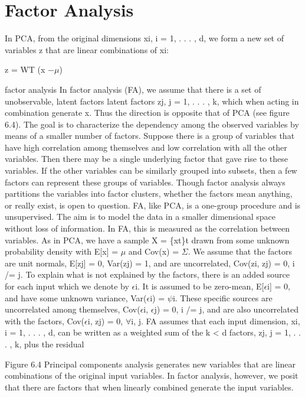 \section{Factor Analysis}

In PCA, from the original dimensions xi, i = 1, . . . , d, we form a new set of variables z that are linear combinations of xi:

z = WT (x $-$$\mu$)

factor analysis In factor analysis (FA), we assume that there is a set of unobservable, latent factors latent factors zj, j = 1, . . . , k, which when acting in combination generate x. Thus the direction is opposite that of PCA (see figure 6.4). The goal is to characterize the dependency among the observed variables by means of a smaller number of factors. Suppose there is a group of variables that have high correlation among themselves and low correlation with all the other variables. Then there may be a single underlying factor that gave rise to these variables. If the other variables can be similarly grouped into subsets, then a few factors can represent these groups of variables. Though factor analysis always partitions the variables into factor clusters, whether the factors mean anything, or really exist, is open to question. FA, like PCA, is a one-group procedure and is unsupervised. The aim is to model the data in a smaller dimensional space without loss of information. In FA, this is measured as the correlation between variables. As in PCA, we have a sample X = \{xt\}t drawn from some unknown probability density with E[x] = $\mu$ and Cov(x) = $\Sigma$. We assume that the factors are unit normals, E[zj] = 0, Var(zj) = 1, and are uncorrelated, Cov(zi, zj) = 0, i /= j. To explain what is not explained by the factors, there is an added source for each input which we denote by $\epsilon$i. It is assumed to be zero-mean, E[$\epsilon$i] = 0, and have some unknown variance, Var($\epsilon$i) = $\psi$i. These specific sources are uncorrelated among themselves, Cov($\epsilon$i, $\epsilon$j) = 0, i /= j, and are also uncorrelated with the factors, Cov($\epsilon$i, zj) = 0, $\forall$i, j. FA assumes that each input dimension, xi, i = 1, . . . , d, can be written as a weighted sum of the k < d factors, zj, j = 1, . . . , k, plus the residual

Figure 6.4 Principal components analysis generates new variables that are linear combinations of the original input variables. In factor analysis, however, we posit that there are factors that when linearly combined generate the input variables.

